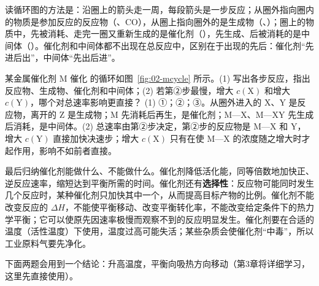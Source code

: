 读循环图的方法是：沿圈上的箭头走一周，每段箭头是一步反应；从圈外指向圈内的物质是参加反应的反应物（、CO），从圈上指向圈外的是生成物（、）；圈上的物质中，先被消耗、走完一圈又重新生成的是催化剂（），先生成、后被消耗的是中间体（）。催化剂和中间体都不出现在总反应中，区别在于出现的先后：催化剂“先进后出”，中间体“先出后进”。

\begin{liti}[典型]
某金属催化剂 M 催化  的循环如图~\ref{fig:02-mcycle} 所示。(1) 写出各步反应，指出反应物、生成物、催化剂和中间体；(2) 若第②步最慢，增大 $c(\mathrm{X})$ 和增大 $c(\mathrm{Y})$，哪个对总速率影响更直接？
\tcblower
\jie (1) ①；②；③。从圈外进入的 X、Y 是反应物，离开的 Z 是生成物；M 先消耗后再生，是催化剂；M—X、M—XY 先生成后消耗，是中间体。(2) 总速率由第②步决定，第②步的反应物是 M—X 和 Y，增大 $c(\mathrm{Y})$ 直接加快决速步；增大 $c(\mathrm{X})$ 只有在使 M—X 的浓度随之增大时才起作用，影响不如前者直接。
\end{liti}

最后归纳催化剂能做什么、不能做什么。催化剂降低活化能，同等倍数地加快正、逆反应速率，缩短达到平衡所需的时间。催化剂还有\textbf{选择性}：反应物可能同时发生几个反应时，某种催化剂只加快其中一个，从而提高目标产物的比例。催化剂不能改变反应的 $\Delta H$，不能使平衡移动、改变平衡转化率，不能改变给定条件下的热力学平衡；它可以使原先因速率极慢而观察不到的反应明显发生。催化剂要在合适的温度（活性温度）下使用，温度过高可能失活；某些杂质会使催化剂“中毒”，所以工业原料气要先净化。

下面两题会用到一个结论：升高温度，平衡向吸热方向移动（第3章将详细学习，这里先直接使用）。

